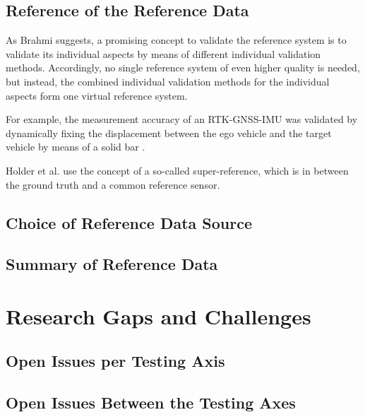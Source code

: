 \documentclass[conference]{IEEEtran}
\newcommand{\new}[1]{{\color{my-red}#1}}
\begin{document}
\subsection{\new{Reference of the Reference Data}}

As Brahmi \cite[Sec. 10, Sec. 14]{Brahmi2020diss} suggests, a promising concept to validate the reference system is to validate its individual aspects by means of different individual validation methods. 
Accordingly, no single reference system of even higher quality is needed, but instead, the combined individual validation methods for the individual aspects form one virtual reference system. 

For example, the measurement accuracy of an RTK-GNSS-IMU was validated by dynamically fixing the displacement between the ego vehicle and the target vehicle by means of a solid bar \cite[Sec. 14.2]{Brahmi2020diss}. 

Holder et al. \cite{Holder2022calibration} use the concept of a so-called super-reference, which is in between the ground truth and a common reference sensor. 

\subsection{Choice of Reference Data Source}
\label{sec:ref_data_tradeoffs}

\subsection{Summary of Reference Data}
\label{sec:ref_data_conclusion}



\section{Research Gaps and Challenges}
\label{sec:discussion}

\subsection{Open Issues per Testing Axis}
\label{sec:discussion_answers}



\subsection{Open Issues Between the Testing Axes}
\label{sec:discussion_interdependencies}
\end{document}
